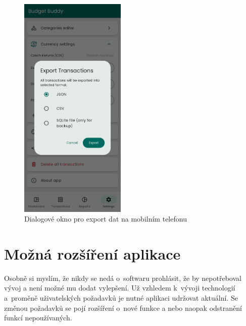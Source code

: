 \documentclass[
  biblatex,
  figures=true,
  tables=false,
  glossaries,
  index
]{kidiplom}
\begin{document}
\begin{figure}
  \centering
  \includegraphics[width=0.45\textwidth]{images/export-mobile.png}
  \caption{Dialogové okno pro export dat na mobilním telefonu}
  \label{fig:export}
\end{figure}

\section{Možná rozšíření aplikace}
Osobně si myslím, že nikdy se nedá o~softwaru prohlásit, že by nepotřeboval vývoj a není možné mu dodat vylepšení. Už vzhledem k~vývoji technologií a~proměně uživatelských požadavků je nutné aplikaci udržovat aktuální. Se změnou požadavků se pojí rozšíření o~nové funkce a nebo naopak odstranění funkcí nepoužívaných.
\end{document}
